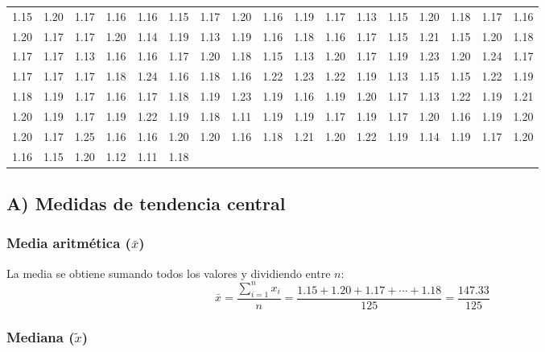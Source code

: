 {\vspace{6pt}
{\footnotesize
\renewcommand{\arraystretch}{1.2}
\begin{center}
\begin{tabular}{*{17}{r@{\hspace{5pt}}}}
1.15 & 1.20 & 1.17 & 1.16 & 1.16 & 1.15 & 1.17 & 1.20 & 1.16 & 1.19 & 1.17 & 1.13 & 1.15 & 1.20 & 1.18 & 1.17 & 1.16 \\
1.20 & 1.17 & 1.17 & 1.20 & 1.14 & 1.19 & 1.13 & 1.19 & 1.16 & 1.18 & 1.16 & 1.17 & 1.15 & 1.21 & 1.15 & 1.20 & 1.18 \\
1.17 & 1.17 & 1.13 & 1.16 & 1.16 & 1.17 & 1.20 & 1.18 & 1.15 & 1.13 & 1.20 & 1.17 & 1.19 & 1.23 & 1.20 & 1.24 & 1.17 \\
1.17 & 1.17 & 1.17 & 1.18 & 1.24 & 1.16 & 1.18 & 1.16 & 1.22 & 1.23 & 1.22 & 1.19 & 1.13 & 1.15 & 1.15 & 1.22 & 1.19 \\
1.18 & 1.19 & 1.17 & 1.16 & 1.17 & 1.18 & 1.19 & 1.23 & 1.19 & 1.16 & 1.19 & 1.20 & 1.17 & 1.13 & 1.22 & 1.19 & 1.21 \\
1.20 & 1.19 & 1.17 & 1.19 & 1.22 & 1.19 & 1.18 & 1.11 & 1.19 & 1.19 & 1.17 & 1.19 & 1.17 & 1.20 & 1.16 & 1.19 & 1.20 \\
1.20 & 1.17 & 1.25 & 1.16 & 1.16 & 1.20 & 1.20 & 1.16 & 1.18 & 1.21 & 1.20 & 1.22 & 1.19 & 1.14 & 1.19 & 1.17 & 1.20 \\
1.16 & 1.15 & 1.20 & 1.12 & 1.11 & 1.18 & & & & & & & & & & & \\
\end{tabular}
\end{center}
}}

\subsection{A) Medidas de tendencia central}

\subsubsection*{Media aritm\'etica ($\bar{x}$)}

La media se obtiene sumando todos los valores y dividiendo entre $n$:
\[
\bar{x} = \frac{\displaystyle\sum_{i=1}^{n} x_i}{n}
        = \frac{1.15 + 1.20 + 1.17 + \cdots + 1.18}{125}
        = \frac{147.33}{125}
\]


\subsubsection*{Mediana ($\tilde{x}$)}

